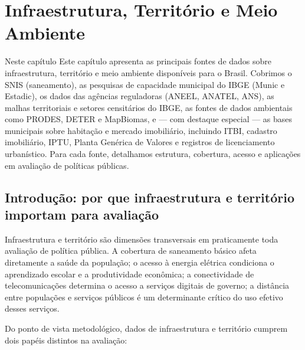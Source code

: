 
\chapter{Infraestrutura, Território e Meio Ambiente}

\begin{boxdestaque}{Neste capítulo}
Este capítulo apresenta as principais fontes de dados sobre infraestrutura, território e meio ambiente disponíveis para o Brasil. Cobrimos o SNIS (saneamento), as pesquisas de capacidade municipal do IBGE (Munic e Estadic), os dados das agências reguladoras (ANEEL, ANATEL, ANS), as malhas territoriais e setores censitários do IBGE, as fontes de dados ambientais como PRODES, DETER e MapBiomas, e --- com destaque especial --- as bases municipais sobre habitação e mercado imobiliário, incluindo ITBI, cadastro imobiliário, IPTU, Planta Genérica de Valores e registros de licenciamento urbanístico. Para cada fonte, detalhamos estrutura, cobertura, acesso e aplicações em avaliação de políticas públicas.
\end{boxdestaque}

\section{Introdução: por que infraestrutura e território importam
         para avaliação}

Infraestrutura e território são dimensões transversais em praticamente toda avaliação de política pública. A cobertura de saneamento básico afeta diretamente a saúde da população; o acesso à energia elétrica condiciona o aprendizado escolar e a produtividade econômica; a conectividade de telecomunicações determina o acesso a serviços digitais de governo; a distância entre populações e serviços públicos é um determinante crítico do uso efetivo desses serviços.

Do ponto de vista metodológico, dados de infraestrutura e território cumprem dois papéis distintos na avaliação:

